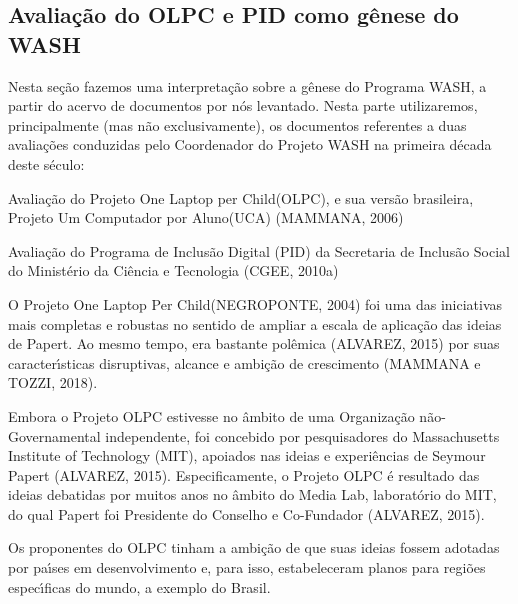 \documentclass[
12pt,		%
openright,	%
twoside,  %
a4paper,			%
chapter=TITLE,		%
english,			%
french,				%
spanish,			%
brazil				%
]{USPSC-classe/USPSC}
\begin{document}
\subsection[Avalia\c{c}\~ao do OLPC e PID como g\^enese do WASH]{Avalia\c{c}\~ao do OLPC e PID como g\^enese do WASH}\label{Avalia\c{c}\~ao do OLPC e PID como g\^enese do WASH}
Nesta se\c{c}\~ao fazemos uma interpreta\c{c}\~ao sobre a g\^enese do Programa WASH, a partir do acervo de documentos por n\'os levantado. Nesta parte utilizaremos, principalmente (mas n\~ao exclusivamente), os documentos referentes a duas avalia\c{c}\~oes conduzidas pelo Coordenador do Projeto WASH na primeira d\'ecada deste s\'eculo:





\begin{alineas}
\item Avalia\c{c}\~ao do Projeto \textquotedbl One Laptop per Child\textquotedbl  (OLPC), e sua vers\~ao brasileira, \textquotedbl Projeto Um Computador por Aluno\textquotedbl  (UCA)  (MAMMANA, 2006)
\item Avalia\c{c}\~ao do Programa de Inclus\~ao Digital (PID) da Secretaria de Inclus\~ao Social do Minist\'erio da Ci\^encia e Tecnologia  (CGEE, 2010a)
\end{alineas}

O Projeto \textquotedbl One Laptop Per Child\textquotedbl  (NEGROPONTE, 2004) foi uma das iniciativas mais completas e robustas no sentido de ampliar a escala de aplica\c{c}\~ao das ideias de Papert. Ao mesmo tempo, era bastante pol\^emica (ALVAREZ, 2015) por suas caracter\'{\i}sticas disruptivas, alcance e ambi\c{c}\~ao de crescimento (MAMMANA e TOZZI, 2018).




Embora o Projeto OLPC estivesse no \^ambito de uma Organiza\c{c}\~ao n\~ao-Governamental independente,  foi concebido por pesquisadores do Massachusetts Institute of Technology (MIT), apoiados nas ideias e experi\^encias de Seymour Papert  (ALVAREZ, 2015). Especificamente, o Projeto OLPC \'e resultado das ideias debatidas por muitos anos no \^ambito do Media Lab, laborat\'orio do MIT, do qual Papert foi Presidente do Conselho e Co-Fundador  (ALVAREZ, 2015).




Os proponentes do OLPC tinham a ambi\c{c}\~ao de que suas ideias fossem adotadas por pa\'{\i}ses em desenvolvimento e, para isso, estabeleceram planos para regi\~oes espec\'{\i}ficas do mundo, a exemplo do Brasil.
\end{document}
